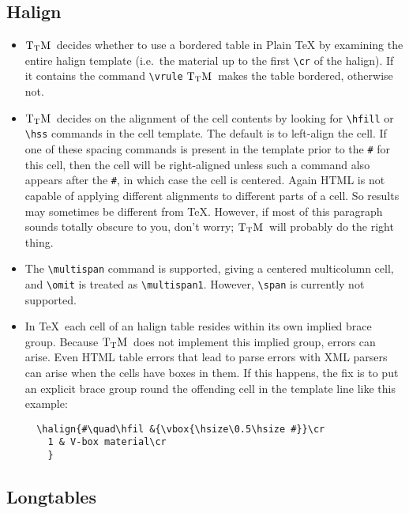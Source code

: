 \documentclass[12pt]{article}
\def\TtM{$\rm{}T_TH$}
\def\TtM{$\rm{}T_TM$}%
\begin{document}
\subsection{Halign}

\begin{itemize}

\item \TtM\ decides whether to use a bordered table in Plain \TeX
 by examining the entire halign template (i.e.~the material up to the
first \verb|\cr| of the halign). If it contains the command
\verb|\vrule| \TtM\ makes the table bordered, otherwise not.


\item \TtM\ decides on the alignment of the cell contents by looking for
\verb|\hfill| or \verb|\hss| commands in the cell template. The
default is to left-align the cell. If one of these spacing commands is present
in the template prior to the \verb|#| for this cell, then the cell
will be right-aligned unless such a command also appears after the
\verb|#|, in which case the cell is centered. Again HTML is not capable of
applying different alignments to different parts of a cell. So results may
sometimes be different from \TeX. However, if most of this paragraph
sounds totally obscure to you, don't worry; \TtM\ will probably do the
right thing.

\item The \verb|\multispan| command is supported, giving a centered
multicolumn cell, and \verb|\omit| is treated as \verb|\multispan1|.
However, \verb|\span| is currently not supported.

\item In \TeX\ each cell of an halign table resides within its own
  implied brace group. Because \TtM\ does not implement this implied
  group, errors can arise. Even HTML table errors that lead to parse
  errors with XML parsers can arise when the cells have boxes in them.
  If this happens, the fix is to put an explicit brace group round the
  offending cell in the template line like this example:
\begin{verbatim}
  \halign{#\quad\hfil &{\vbox{\hsize\0.5\hsize #}}\cr
    1 & V-box material\cr
    }
\end{verbatim}

\end{itemize}


\subsection{Longtables}
\label{longtab}
\end{document}
